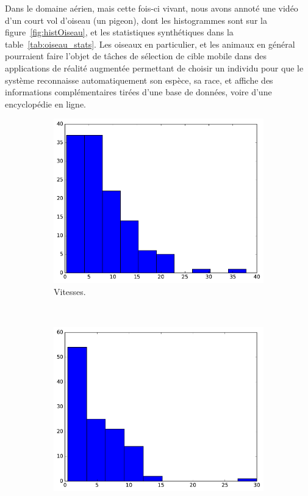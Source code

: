 	Dans le domaine aérien, mais cette fois-ci vivant, nous avons annoté une vidéo d'un court vol d'oiseau (un pigeon), dont les histogrammes sont sur la figure~\ref{fig:histOiseau}, et les statistiques synthétiques dans la table~\ref{tab:oiseau_stats}. Les oiseaux en particulier, et les animaux en général pourraient faire l'objet de tâches de sélection de cible mobile dans des applications de réalité augmentée permettant de choisir un individu pour que le système reconnaisse automatiquement son espèce, sa race, et affiche des informations complémentaires tirées d'une base de données, voire d'une encyclopédie en ligne.
		
	\begin{figure}[!htbp]
		\begin{subfigure}[t]{\subImgWclicks}
			\centering
			\includegraphics[width=\textwidth]{figures/ch3/oiseau_filteredSpeed}
			\caption{Vitesses.}
			\label{fig:oiseau_filteredSpeed}
		\end{subfigure}
		~
		\begin{subfigure}[t]{\subImgWclicks}
			\centering
			\includegraphics[width=\textwidth]{figures/ch3/oiseau_frequency}

\end{subfigure}
\end{figure}
